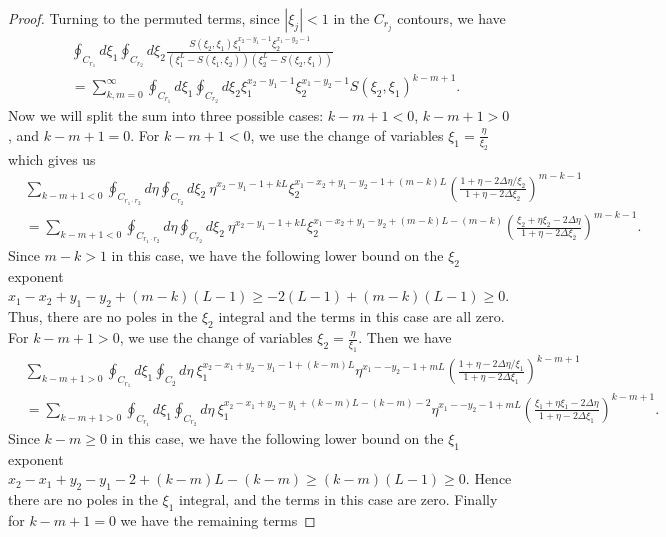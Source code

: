 \documentclass[a4paper,11pt]{article}
\theoremstyle{definition}
\begin{document}
\begin{proof}
Turning to the permuted terms, since $|\xi_j|< 1$ in the $C_{r_j}$ contours, we have
\begin{equation}\begin{split}
&\oint_{C_{r_1}}d\xi_1\oint_{C_{r_2}}d\xi_2 \frac{S(\xi_2,\xi_1)\xi_1^{x_2-y_1-1}\xi_2^{x_1-y_2-1}}{\left(\xi_1^L - S(\xi_1,\xi_2) \right)\left(\xi_2^L - S(\xi_2,\xi_1) \right)}\\
&=\sum_{k,m=0}^\infty \oint_{C_{r_1}}d\xi_1\oint_{C_{r_2}}d\xi_2 \xi_1^{x_2-y_1-1}\xi_2^{x_1-y_2-1}S(\xi_2,\xi_1)^{k-m+1}.
\end{split}
\end{equation}
Now we will split the sum into three possible cases: $k-m+1<0$, $k-m+1>0$, and $k-m+1=0$. For $k-m+1<0$, we use the change of variables $\xi_1=\frac{\eta}{\xi_2}$ which gives us
\begin{equation}
    \begin{split}
        &\sum_{k-m+1<0}\oint_{C_{r_1\cdot r_2}}d\eta\oint_{C_{r_2}}d\xi_2 \ \eta^{x_2-y_1-1+kL}\xi_2^{x_1-x_2+y_1-y_2-1+(m-k)L}\left(\frac{1+\eta-2\Delta\eta/\xi_2}{1+\eta-2\Delta\xi_2} \right)^{m-k-1} \\
        &= \sum_{k-m+1<0}\oint_{C_{r_1\cdot r_2}}d\eta\oint_{C_{r_2}}d\xi_2 \ \eta^{x_2-y_1-1+kL}\xi_2^{x_1-x_2+y_1-y_2+(m-k)L-(m-k)}\left(\frac{\xi_2+\eta\xi_2-2\Delta\eta}{1+\eta-2\Delta\xi_2} \right)^{m-k-1}.
    \end{split}
\end{equation}
Since $m-k>1$ in this case, we have the following lower bound on the $\xi_2$ exponent $x_1-x_2+y_1-y_2+(m-k)(L-1)\geq -2(L-1)+(m-k)(L-1)\geq 0$. Thus, there are no poles in the $\xi_2$ integral and the terms in this case are all zero. For $k-m+1>0$, we use the change of variables $\xi_2=\frac{\eta}{\xi_1}$. Then we have 
\begin{equation}
    \begin{split}
        &\sum_{k-m+1>0}\oint_{C_{r_1}}d\xi_1\oint_{C_2}d\eta \ \xi_1^{x_2-x_1+y_2-y_1-1+(k-m)L}\eta^{x_1--y_2-1+mL}\left(\frac{1+\eta-2\Delta\eta/\xi_1}{1+\eta-2\Delta\xi_1} \right)^{k-m+1} \\
        &=\sum_{k-m+1>0}\oint_{C_{r_1}}d\xi_1\oint_{C_{r_2}}d\eta \ \xi_1^{x_2-x_1+y_2-y_1+(k-m)L-(k-m)-2}\eta^{x_1--y_2-1+mL}\left(\frac{\xi_1+\eta\xi_1-2\Delta\eta}{1+\eta-2\Delta\xi_1} \right)^{k-m+1}.
        \end{split}
\end{equation}
Since $k-m\geq0$ in this case, we have the following lower bound on the $\xi_1$ exponent $x_2-x_1+y_2-y_1-2+(k-m)L-(k-m)\geq (k-m)(L-1) \geq 0$. Hence there are no poles in the $\xi_1$ integral, and the terms in this case are zero. Finally for $k-m+1 = 0$ we have the remaining terms

\end{proof}
\end{document}
